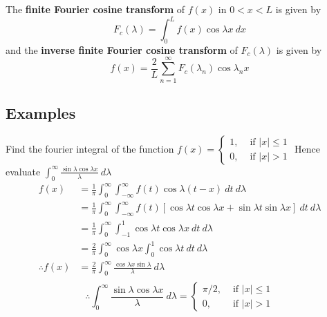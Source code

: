 \documentclass[12pt]{article}
\numberwithin{equation}{subsection}
\begin{document}
The \textbf{finite Fourier cosine transform} of $f(x)$ in $0<x<L$ is given by
\begin{equation}
    \boxed{ F_c(\lambda) = \int_{0}^{L} { f(x) \cos{\lambda x} } \: d{x} }
\end{equation}
and the \textbf{inverse finite Fourier cosine transform} of $F_c(\lambda)$ is given by
\begin{equation}
    \boxed{ f(x) = \frac{2}{L} \sum_{n=1}^{\infty} { F_c(\lambda_n) \cos{\lambda_n x} } }
\end{equation}


\subsection{Examples}

\begin{example}{
        Find the fourier integral of the function $\displaystyle f(x) = \begin{cases}
            1, &\text{ if }|x| \le 1 \\
            0, & \text{ if } |x| > 1
        \end{cases}$ Hence evaluate $\displaystyle \int_{0}^{\infty} { \frac{\sin{\lambda}\cos{\lambda x}}{\lambda} } \: d{\lambda} $
    }{}
    \begin{align*}
        f(x) &= \frac{1}{\pi} \int_{0}^{\infty} { \int_{-\infty}^{\infty} { f(t) \cos{\lambda(t-x)} } \: d{t} } \: d{\lambda} \\
        &= \frac{1}{\pi} \int_{0}^{\infty} { \int_{-\infty}^{\infty} { f(t) \left[ \cos{\lambda t}\cos{\lambda x} + \sin{\lambda t}\sin{\lambda x} \right] } \: d{t} } \: d{\lambda} \\
        &= \frac{1}{\pi} \int_{0}^{\infty} { \int_{-1}^{1} { \cos{\lambda t}\cos{\lambda x} } \: d{t} } \: d{\lambda} \\
        &= \frac{2}{\pi} \int_{0}^{\infty} { \cos{\lambda x} \int_{0}^{1} {\cos{\lambda t}} \: d{t} } \: d{\lambda} \\
        \therefore f(x) &= \frac{2}{\pi} \int_{0}^{\infty} { \frac{\cos{\lambda x} \sin{\lambda}}{\lambda} } \: d{\lambda} \\
    \end{align*}
    \[
        \therefore \int_{0}^{\infty} {\frac{\sin{\lambda}\cos{\lambda x}}{\lambda}} \: d{\lambda} = 
        \begin{cases}
            \pi/2, &\text{ if } |x| \le 1 \\
            0, &\text{ if } |x| > 1
        \end{cases}
    \]
\end{example}
\end{document}
